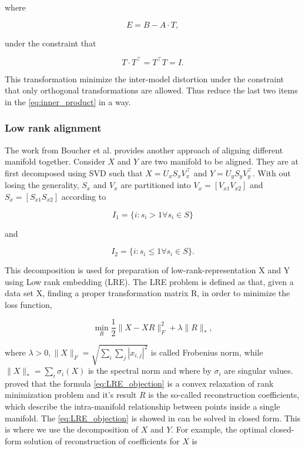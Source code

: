  where 
  
  \begin{equation}
    E=B-A\cdot T,
  \end{equation}
    
    under the constraint that 
  
  \begin{equation}
    T\cdot T^\intercal=T^\intercal T=I.
  \end{equation}
  
  This transformation minimize the inter-model distortion under the constraint that only orthogonal transformations are allowed. Thus reduce the last two items in the \eqref{eq:inner_product} in a way.

  \subsubsection{Low rank alignment}
  The work from Boucher et al. \cite{boucher2015aligning} provides another approach of aligning different manifold together. Consider $X$ and $Y$ are two manifold to be aligned. They are at first decomposed using SVD such that $X=U_xS_xV_x^\intercal$ and $Y=U_yS_yV_y^\intercal$. With out losing the generality, $S_x$ and $V_x$ are partitioned into $V_x=[V_{x1}V_{x2}]$ and $S_x=[S_{x1}S_{x2}]$ according to 

  \begin{equation}
    I_1=\{i:s_i>1 \forall s_i \in S\}
  \end{equation}

  and
  
  \begin{equation}
    I_2=\{i:s_i\leq 1 \forall s_i\in S\}.
  \end{equation} 

  This decomposition is used for preparation of low-rank-representation X and Y using Low rank embedding (LRE). The LRE problem is defined as that, given a data set X, finding a proper transformation matrix R, in order to minimize the loss function,

  \begin{equation}\label{eq:LRE_objection}
    \min_R\frac{1}{2}\|X-XR\|^2_F+\lambda\|R\|_*,
  \end{equation}

  where $\lambda > 0, \|X\|_F=\sqrt{\sum_i\sum_j|x_{i,j}|^2}$ is called Frobenius norm, while $\|X\|_*=\sum_i\sigma_i(X)$ is the spectral norm and where by $\sigma_i$ are singular values. \cite{candes2010power} proved that the formula \eqref{eq:LRE_objection} is a convex relaxation of rank minimization problem and it's result $R$ is the so-called reconstruction coefficients, which describe the intra-manifold relationship between points inside a single manifold. The \eqref{eq:LRE_objection} is showed in \cite{favaro2011closed} can be solved in closed form. This is where we use the decomposition of $X$ and $Y$. For example, the optimal closed-form solution of reconstruction of coefficients for $X$ is
  

